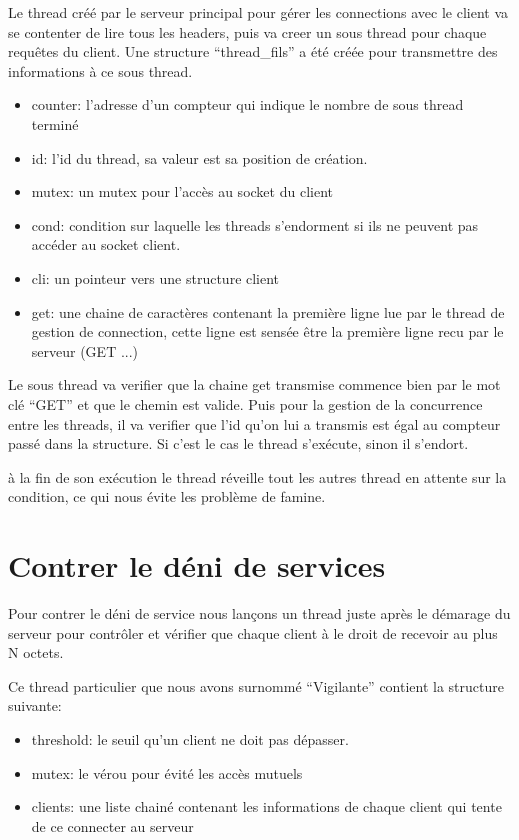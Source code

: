 \documentclass{article}
\begin{document}
Le thread créé par le serveur principal pour gérer les connections avec le client va se contenter de lire tous les headers, puis va creer un sous thread pour chaque requêtes du client.
Une structure ``thread\_fils'' a été créée pour transmettre des informations à ce sous thread.
\begin{itemize}
\item counter: l'adresse d'un compteur qui indique le nombre de sous thread terminé
\item id: l'id du thread, sa valeur est sa position de création.
\item mutex: un mutex pour l'accès au socket du client
\item cond: condition sur laquelle les threads s'endorment si ils ne peuvent pas accéder
  au socket client.
\item cli: un pointeur vers une structure client
\item get: une chaine de caractères contenant la première ligne lue par le thread de gestion de connection, cette ligne est sensée être la première ligne recu par le serveur (GET ...)
\end{itemize}

Le sous thread va verifier que la chaine get transmise commence bien par le mot clé ``GET'' et que le chemin est valide. Puis pour la gestion de la concurrence entre les threads, il va verifier que l'id qu'on lui a transmis est égal au compteur passé dans la structure. Si c'est le cas le thread s'exécute, sinon il s'endort.

à la fin de son exécution le thread réveille tout les autres thread en attente sur la condition, ce qui nous évite les problème de famine.

\section{Contrer le déni de services}

Pour contrer le déni de service nous lançons un thread juste après le démarage du serveur pour contrôler et vérifier que chaque client à le droit de recevoir au plus N octets.

Ce thread particulier que nous avons surnommé ``Vigilante'' contient la structure suivante:
\begin{itemize}
\item threshold: le seuil qu'un client ne doit pas dépasser.
\item mutex: le vérou pour évité les accès mutuels
\item clients: une liste chainé contenant les informations de chaque client qui tente de ce connecter au serveur
\end{itemize}
\end{document}
